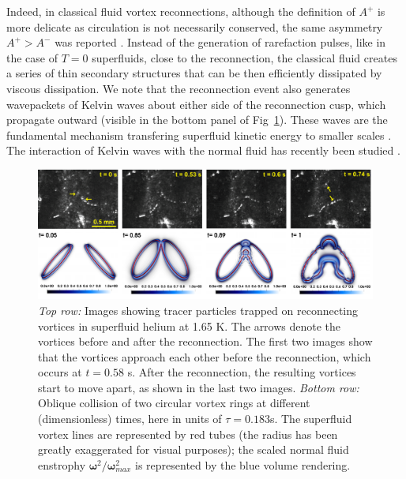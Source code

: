 \documentclass[9pt,twocolumn,twoside]{pnas-new}
\newcommand{\bom}{\boldsymbol{\omega}}
\begin{document}
Indeed, in classical fluid vortex reconnections, although the definition of $A^+$ is more delicate as circulation is not necessarily conserved, the same asymmetry $A^+>A^-$ was reported \cite{yaoSeparationScalingViscous2020}. Instead of the generation of rarefaction pulses, like in the case of $T=0$ superfluids, close to the reconnection, the classical fluid creates a series of thin secondary structures that can be then efficiently dissipated by viscous dissipation.
We note that the reconnection event also generates wavepackets of Kelvin waves about either side of the reconnection cusp, which propagate outward (visible in the bottom panel of Fig~\ref{fig:ring-coll-viz}). These waves are the fundamental mechanism transfering superfluid kinetic energy to smaller scales \cite{vinen2001decay,vinen2002quantum}. The interaction of Kelvin waves with the normal fluid has recently been studied \cite{stasiakCrossComponentEnergyTransfer2024,stasiak2025inverse}.

\begin{figure}
	 \centering
	\includegraphics*[width=\textwidth]{snaps-combined.pdf}
	\caption{\emph{Top row:} Images showing tracer particles trapped on reconnecting vortices in superfluid helium at 1.65 K. The arrows denote the vortices before and after the reconnection. The first two images show that the vortices approach each other before the reconnection, which occurs at $t=0.58$ s. After the reconnection, the resulting vortices start to move apart, as shown in the last two images.
	\emph{Bottom row:} Oblique collision of two circular vortex rings at different 
	(dimensionless) times, here in units of $\tau=0.183$s.
	The superfluid vortex lines are represented by red tubes (the radius has been greatly 
	exaggerated for visual purposes); the scaled normal fluid enstrophy 
	$\bom^2/\bom^2_{max}$ is represented by the blue volume rendering.}
	\label{fig:ring-coll-viz}
\end{figure}
\end{document}
